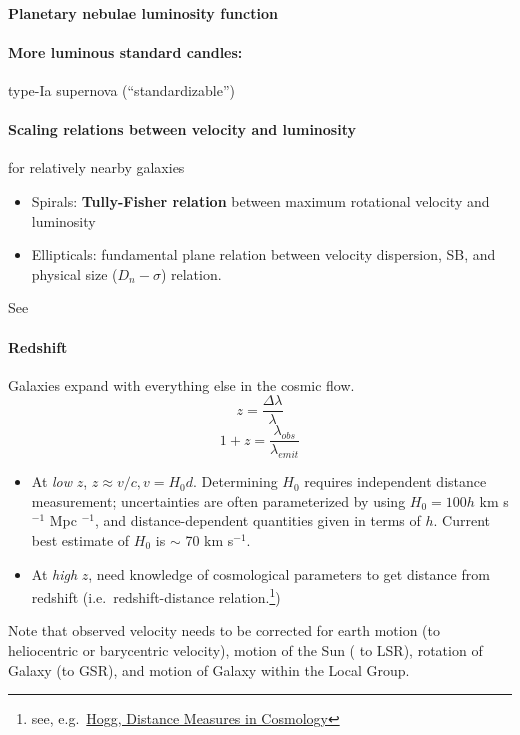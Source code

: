 \documentclass{article}
\newcommand{\mynotes}[1]{\textcolor{cadmiumgreen}{#1}}
\begin{document}
\paragraph{Planetary nebulae luminosity function}

\paragraph{More luminous standard candles:}
type-Ia supernova (``standardizable'')

\paragraph{Scaling relations between velocity and luminosity}
\mynotes{for relatively nearby galaxies}
\begin{itemize}
    \item Spirals: \textbf{Tully-Fisher relation} between maximum rotational velocity and luminosity
    \item Ellipticals: fundamental plane relation between velocity
        dispersion, SB, and physical size
        ($D_{n}-\sigma$) relation.
\end{itemize}
See %

\paragraph{Redshift}
Galaxies expand with everything else in the cosmic flow.
\[
    z = \frac{\Delta\lambda}{\lambda}
    \]
\[
    1 + z = \frac{\lambda_{obs}}{\lambda_{emit}}
    \]
\begin{itemize}
    \item At \emph{low} $z$, $z \approx v/c, v = H_{0}d$.
        Determining $H_{0}$ requires independent distance measurement;
        uncertainties are often parameterized by using $H_{0} = 100h$
        km s$^{-1}$ Mpc $^{-1}$, and distance-dependent quantities given
        in terms of $h$. Current best estimate of $H_{0}$ is $\sim$ 70 km s$^{-1}$.
    \item At \emph{high} $z$, need knowledge of cosmological
        parameters to get distance from redshift (i.e.\ redshift-distance
        relation.\footnote{see, e.g.\
        \href{http://ned.ipac.caltech.edu/level5/Hogg/Hogg_contents.html}
        {Hogg, Distance Measures in Cosmology}})
\end{itemize}

Note that observed velocity needs to be corrected for earth motion (to
heliocentric or barycentric velocity), motion of the Sun ( to LSR), rotation of
Galaxy (to GSR), and motion of Galaxy within the Local Group.
\end{document}

